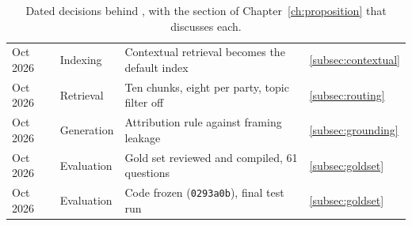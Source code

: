 \begin{table}[p]
\begin{tabular}{|l|l|p{}|l|}
        Oct 2026 & Indexing & Contextual retrieval becomes the default index & \ref{subsec:contextual} \\
        Oct 2026 & Retrieval & Ten chunks, eight per party, topic filter off & \ref{subsec:routing} \\
        Oct 2026 & Generation & Attribution rule against framing leakage & \ref{subsec:grounding} \\
        Oct 2026 & Evaluation & Gold set reviewed and compiled, 61 questions & \ref{subsec:goldset} \\
        Oct 2026 & Evaluation & Code frozen (\texttt{0293a0b}), final test run & \ref{subsec:goldset} \\
        \hline
    \end{tabular}
    \caption[Decision timeline]{Dated decisions behind \sysname{}, with the
    section of Chapter~\ref{ch:proposition} that discusses each.}
    \label{tab:timeline}
\end{table}
